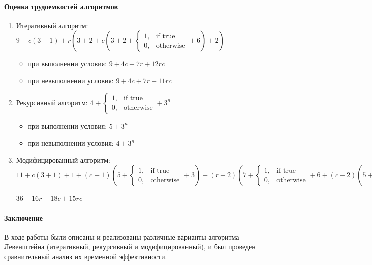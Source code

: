 \documentclass[utf8x, 12pt]{G7-32} %
\begin{document}
\paragraph{Оценка трудоемкостей алгоритмов}
\begin{enumerate}
	\item Итеративный алгоритм: $9 + c(3 + 1) + r(3 + 2 + c(3 + 2 + 
	\begin{cases}
	1,& \text{if true}\\
	0,& \text{otherwise}
	\end{cases}
	 + 6) + 2)$
	\begin{itemize}
		\item при выполнении условия: $9 + 4c + 7r + 12rc$
		\item при невыполнении условия: $9 + 4c + 7r + 11rc$
	\end{itemize}
	\item Рекурсивный алгоритм: $4 + 
	\begin{cases}
	1,& \text{if true}\\
	0,& \text{otherwise}
	\end{cases}
	+ 3^n$
	\begin{itemize}
		\item при выполнении условия: $5 + 3^n$
		\item при невыполнении условия: $4 + 3^n$
	\end{itemize}
	\item Модифицированный алгоритм: $11 + c(3 + 1) + 1 + (c - 1)(5 + \begin{cases} 1,& \text{if true}\\0,& \text{otherwise}\end{cases} + 3) + (r - 2)(7 + \begin{cases} 1,& \text{if true}\\0,& \text{otherwise}\end{cases} + 6 + (c - 2)(5 + \begin{cases} 1,& \text{if true}\\0,& \text{otherwise}\end{cases} + 10) + 3) \simeq $
	\begin{center}
		$36 - 16r - 18c + 15rc$
	\end{center}
\end{enumerate}

\paragraph{Заключение}

В ходе работы были описаны и реализованы различные варианты алгоритма Левенштейна (итеративный, рекурсивный и модифицированный), и был проведен сравнительный анализ их временной эффективности.

\backmatter %

\appendix   %
\end{document}
